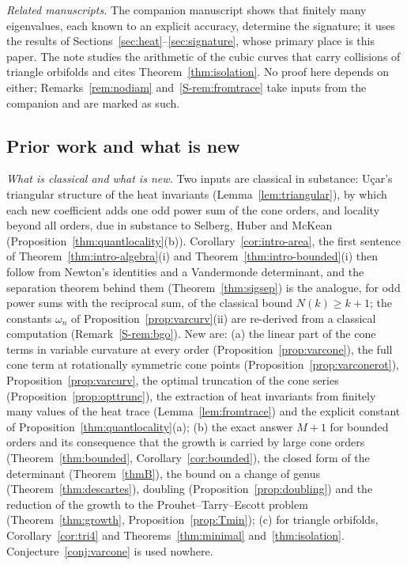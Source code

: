 \documentclass[pdflatex,sn-mathphys-num]{sn-jnl}
\theoremstyle{thmstyleone}%
\theoremstyle{thmstylethree}%
\newcommand{\sref}[1]{\ref*{S-#1}}%
\begin{document}
\emph{Related manuscripts.} The companion manuscript \cite{companionB} shows that finitely many eigenvalues, each known to an explicit accuracy, determine the signature; it uses the results of Sections~\ref{sec:heat}--\ref{sec:signature}, whose primary place is this paper. The note \cite{companion} studies the arithmetic of the cubic curves that carry collisions of triangle orbifolds and cites Theorem~\ref{thm:isolation}. No proof here depends on either; Remarks~\ref{rem:nodiam} and~\sref{rem:fromtrace} take inputs from the companion and are marked as such.

\subsection{Prior work and what is new}\label{sec:prior}

\emph{What is classical and what is new.} Two inputs are classical in substance: U\c{c}ar's triangular structure of the heat invariants (Lemma~\ref{lem:triangular}), by which each new coefficient adds one odd power sum of the cone orders, and locality beyond all orders, due in substance to Selberg, Huber and McKean (Proposition~\ref{thm:quantlocality}(b)). Corollary~\ref{cor:intro-area}, the first sentence of Theorem~\ref{thm:intro-algebra}(i) and Theorem~\ref{thm:intro-bounded}(i) then follow from Newton's identities and a Vandermonde determinant, and the separation theorem behind them (Theorem~\ref{thm:sigsep}) is the analogue, for odd power sums with the reciprocal sum, of the classical bound $N(k)\ge k+1$; the constants $\omega_n$ of Proposition~\ref{prop:varcurv}(ii) are re-derived from a classical computation (Remark~\sref{rem:bgo}). New are: (a) the linear part of the cone terms in variable curvature at every order (Proposition~\ref{prop:varcone}), the full cone term at rotationally symmetric cone points (Proposition~\ref{prop:varconerot}), Proposition~\ref{prop:varcurv}, the optimal truncation of the cone series (Proposition~\ref{prop:opttrunc}), the extraction of heat invariants from finitely many values of the heat trace (Lemma~\ref{lem:fromtrace}) and the explicit constant of Proposition~\ref{thm:quantlocality}(a); (b) the exact answer $M+1$ for bounded orders and its consequence that the growth is carried by large cone orders (Theorem~\ref{thm:bounded}, Corollary~\ref{cor:bounded}), the closed form of the determinant (Theorem~\ref{thmB}), the bound on a change of genus (Theorem~\ref{thm:descartes}), doubling (Proposition~\ref{prop:doubling}) and the reduction of the growth to the Prouhet--Tarry--Escott problem (Theorem~\ref{thm:growth}, Proposition~\ref{prop:Tmin}); (c) for triangle orbifolds, Corollary~\ref{cor:tri4} and Theorems~\ref{thm:minimal} and~\ref{thm:isolation}. Conjecture~\ref{conj:varcone} is used nowhere.
\end{document}
